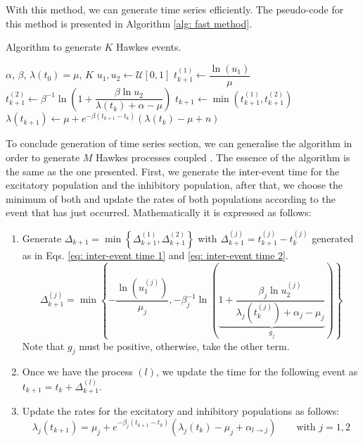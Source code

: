 With this method, we can generate time series efficiently. The pseudo-code for this method is presented in Algorithm \ref{alg: fast method}.
\begin{algorithm}
    \caption{Algorithm to generate $K$ Hawkes events.}\label{alg: fast method}
    \begin{algorithmic}
        \Require $\alpha$, $\beta$, $\lambda(t_0)=\mu$, $K$
            \State $u_1,u_2 \gets \mathcal{U}[0,1]$
            \State $t_{k+1}^{(1)}\gets \dfrac{\ln(u_1)}{\mu}$
            \State $t_{k+1}^{(2)} \gets \beta^{-1}\ln\left( 1+\dfrac{\beta\ln u_2}{\lambda(t_k)+\alpha-\mu} \right)$
            \State $t_{k+1} \gets \min\left( t_{k+1}^{(1)},t_{k+1}^{(2)} \right)$
            \State $\lambda(t_{k+1}) \gets \mu + e^{-\beta(t_{k+1}-t_k)}\left( \lambda(t_k)-\mu+n \right)$
        \EndFor
    \end{algorithmic}
\end{algorithm}

To conclude generation of time series section, we can generalise the algorithm in order to generate $M$ Hawkes processes coupled \cite{dassios2013exact,laub2021elements}. 
The essence of the algorithm is the 
same as the one presented. First, we generate the inter-event time for the excitatory population and the inhibitory population, after that, we choose the minimum of both and update the
rates of both populations according to the event that has just occurred. Mathematically it is expressed as follows:

\begin{enumerate}
    \item Generate $\Delta_{k+1} = \min\left\{ \Delta_{k+1}^{(1)},\Delta_{k+1}^{(2)} \right\}$ with $\Delta_{k+1}^{(j)}=t_{k+1}^{(j)}-t_k^{(j)}$ generated 
    as in Eqs. \ref{eq: inter-event time 1} and \ref{eq: inter-event time 2}.
    \begin{equation}
        \Delta_{k+1}^{(j)} = \min \left\{ -\dfrac{\ln(u_1^{(j)})}{\mu_j},-\beta_j^{-1}\ln\left( \underbrace{1+\dfrac{\beta_j\ln u_2^{(j)}}{\lambda_j\left( t_k^{(j)} \right)+\alpha_j-\mu_j}}_{g_j} \right) \right\}
        \label{eq: inter-event time coupled}
    \end{equation}
    Note that $g_j$ must be positive, otherwise, take the other term.
    \item Once we have the process $(l)$, we update the time for the following event as $t_{k+1}=t_k+\Delta_{k+1}^{(l)}$.
    \item Update the rates for the excitatory and inhibitory populations as follows:
    \begin{equation}
        \lambda_j(t_{k+1}) = \mu_j + e^{-\beta_j(t_{k+1}-t_k)}\left( \lambda_j(t_k)-\mu_j+\alpha_{l\to j} \right) \qquad \text{with } j=1,2
    \end{equation}
\end{enumerate}

